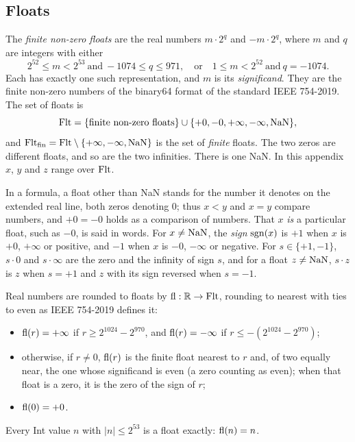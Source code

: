 \subsection{Floats}\label{sec:appendix-dynamic-basis-floats}

The \emph{finite non-zero floats} are the real numbers $m\cdot 2^{q}$ and
$-m\cdot 2^{q}$, where $m$ and $q$ are integers with either
\[
  2^{52}\leq m<2^{53}\ \text{and}\ -1074\leq q\leq 971,
  \quad\text{or}\quad
  1\leq m<2^{52}\ \text{and}\ q=-1074 .
\]
Each has exactly one such representation, and $m$ is its \emph{significand}.
They are the finite non-zero numbers of the binary64 format of the standard
IEEE 754-2019. The set of floats is
\[
  \mathrm{Flt}=\{\text{finite non-zero floats}\}\cup\{+0,-0,+\infty,-\infty,\mathrm{NaN}\},
\]
and $\mathrm{Flt}_{\mathrm{fin}}=\mathrm{Flt}\setminus\{+\infty,-\infty,\mathrm{NaN}\}$ is the set of
\emph{finite} floats. The two zeros are different floats, and so are the two
infinities. There is one NaN.
In this appendix $x$, $y$ and $z$ range over $\mathrm{Flt}$.

In a formula, a float other than NaN stands for the number it denotes on the
extended real line, both zeros denoting $0$; thus $x<y$ and $x=y$ compare
numbers, and $+0=-0$ holds as a comparison of numbers. That $x$ \emph{is} a
particular float, such as $-0$, is said in words. For $x\neq\mathrm{NaN}$, the
\emph{sign} $\mathrm{sgn}(x)$ is $+1$ when $x$ is $+0$, $+\infty$ or positive, and
$-1$ when $x$ is $-0$, $-\infty$ or negative. For $s\in\{+1,-1\}$, $s\cdot 0$
and $s\cdot\infty$ are the zero and the infinity of sign $s$, and for a float
$z\neq\mathrm{NaN}$, $s\cdot z$ is $z$ when $s=+1$ and $z$ with its sign reversed
when $s=-1$.

Real numbers are rounded to floats by $\mathrm{fl}:\mathbb{R}\to\mathrm{Flt}$, rounding
to nearest with ties to even as IEEE 754-2019 defines it:
\begin{itemize}
\item $\mathrm{fl}(r)=+\infty$ if $r\geq 2^{1024}-2^{970}$, and
  $\mathrm{fl}(r)=-\infty$ if $r\leq -(2^{1024}-2^{970})$;
\item otherwise, if $r\neq 0$, $\mathrm{fl}(r)$ is the finite float nearest to $r$
  and, of two equally near, the one whose significand is even (a zero counting
  as even); when that float is a zero, it is the zero of the sign of $r$;
\item $\mathrm{fl}(0)=+0$.
\end{itemize}
Every Int value $n$ with $|n|\leq 2^{53}$ is a float exactly:
$\mathrm{fl}(n)=n$.

